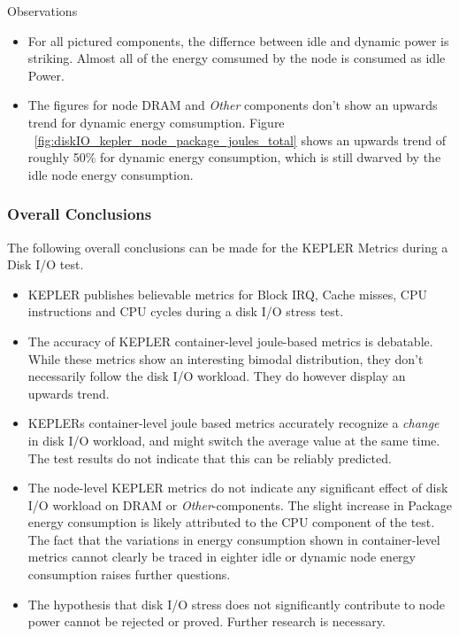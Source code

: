 Observations
\begin{itemize}
    \item For all pictured components, the differnce between idle and dynamic power is striking. Almost all of the energy comsumed by the node is consumed as idle Power.
    \item The figures for node DRAM and \textit{Other} components don't show an upwards trend for dynamic energy comsumption. Figure ~\ref{fig:diskIO_kepler_node_package_joules_total} shows an upwards trend of roughly 50\% for dynamic energy consumption, which is still dwarved by the idle node energy consumption.
\end{itemize}

\subsubsection{Overall Conclusions}

The following overall conclusions can be made for the KEPLER Metrics during a Disk I/O test.
\begin{itemize}
    \item KEPLER publishes believable metrics for Block IRQ, Cache misses, CPU instructions and CPU cycles during a disk I/O stress test.
    \item The accuracy of KEPLER container-level joule-based metrics is debatable. While these metrics show an interesting bimodal distribution, they don't necessarily follow the disk I/O workload. They do however display an upwards trend.
    \item KEPLERs container-level joule based metrics accurately recognize a \textit{change} in disk I/O workload, and might switch the average value at the same time. The test results do not indicate that this can be reliably predicted.
    \item The node-level KEPLER metrics do not indicate any significant effect of disk I/O workload on DRAM or \textit{Other}-components. The slight increase in Package energy consumption is likely attributed to the CPU component of the test. The fact that the variations in energy consumption shown in container-level metrics cannot clearly be traced in eighter idle or dynamic node energy consumption raises further questions.
    \item The hypothesis that disk I/O stress does not significantly contribute to node power cannot be rejected or proved. Further research is necessary.
\end{itemize}


